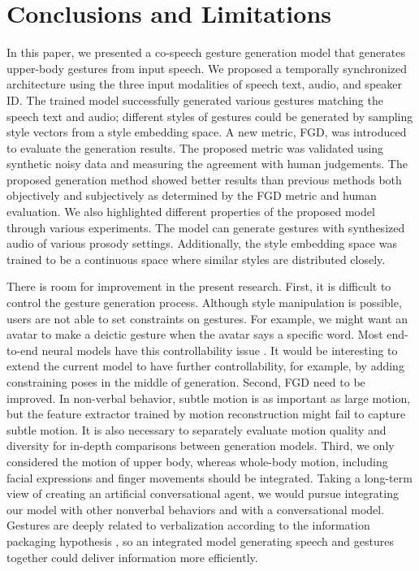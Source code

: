 \documentclass[acmtog]{acmart}
\begin{document}
 \section{Conclusions and Limitations} \label{sec:discussion}

In this paper, we presented a co-speech gesture generation model that generates upper-body gestures from input speech. We proposed a temporally synchronized architecture using the three input modalities of speech text, audio, and speaker ID. The trained model successfully generated various gestures matching the speech text and audio; different styles of gestures could be generated by sampling style vectors from a style embedding space. A new metric, FGD, was introduced to evaluate the generation results. The proposed metric was validated using synthetic noisy data and measuring the agreement with human judgements. The proposed generation method showed better results than previous methods both objectively and subjectively as determined by the FGD metric and human evaluation. We also highlighted different properties of the proposed model through various experiments. The model can generate gestures with synthesized audio of various prosody settings. Additionally, the style embedding space was trained to be a continuous space where similar styles are distributed closely.

There is room for improvement in the present research. First, it is difficult to control the gesture generation process. Although style manipulation is possible, users are not able to set constraints on gestures. For example, we might want an avatar to make a deictic gesture when the avatar says a specific word. Most end-to-end neural models have this controllability issue \cite{jahanian2019steerability}. It would be interesting to extend the current model to have further controllability, for example, by adding constraining poses in the middle of generation. Second, FGD need to be improved. In non-verbal behavior, subtle motion is as important as large motion, but the feature extractor trained by motion reconstruction might fail to capture subtle motion. It is also necessary to separately evaluate motion quality and diversity for in-depth comparisons between generation models. Third, we only considered the motion of upper body, whereas whole-body motion, including facial expressions and finger movements should be integrated. Taking a long-term view of creating an artificial conversational agent, we would pursue integrating our model with other nonverbal behaviors and with a conversational model. Gestures are deeply related to verbalization according to the information packaging hypothesis \cite{kita2000representational}, so an integrated model generating speech and gestures together could deliver information more efficiently. 
\end{document}
